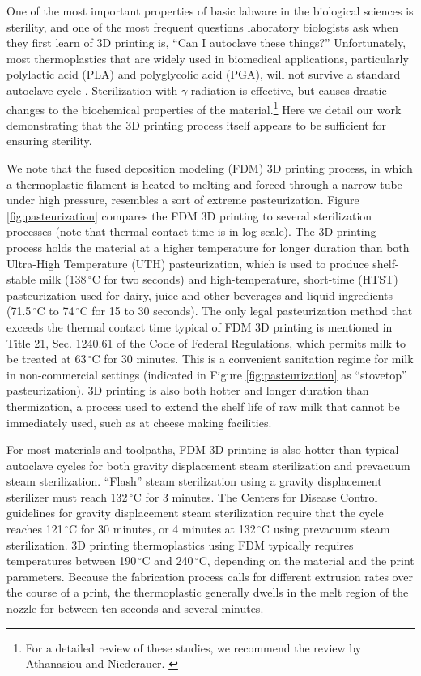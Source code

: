 \documentclass[fleqn,10pt]{wlpeerj}
\begin{document}
One of the most important properties of basic labware in the biological sciences is sterility, and one of the most frequent questions laboratory biologists ask when they first learn of 3D printing is, ``Can I autoclave these things?'' Unfortunately, most thermoplastics that are widely used in biomedical applications, particularly polylactic acid (PLA) and polyglycolic acid (PGA), will not survive a standard autoclave cycle \cite{steam_sterilization_PLA}. Sterilization with $\gamma$-radiation is effective, but causes drastic changes to the biochemical properties of the material.\footnote{For a detailed review of these studies, we recommend the review by Athanasiou and Niederauer. \cite{pla_suture_review}} \cite{gama_radiation_PLA} Here we detail our work demonstrating that the 3D printing process itself appears to be sufficient for ensuring sterility. 

We note that the fused deposition modeling (FDM) 3D printing process, in which a
thermoplastic filament is heated to melting and forced through a
narrow tube under high pressure, resembles a sort of extreme
pasteurization. Figure \ref{fig:pasteurization} compares the FDM 3D printing
to several sterilization processes (note that thermal contact time 
is in log scale). The 3D printing process holds the material at a higher
temperature for longer duration than both Ultra-High Temperature (UTH)
pasteurization, which is used to produce shelf-stable milk
(138$\,^{\circ}\mathrm{C}$ for two seconds) and high-temperature,
short-time (HTST) pasteurization used for dairy, juice and other
beverages and liquid ingredients (71.5$\,^{\circ}\mathrm{C}$ to
74$\,^{\circ}\mathrm{C}$ for 15 to 30 seconds). The only legal
pasteurization method that exceeds the thermal contact time typical of
FDM 3D printing is mentioned in Title 21, Sec. 1240.61 of the Code of
Federal Regulations, which permits milk to be treated at
63$\,^{\circ}\mathrm{C}$ for 30 minutes. This is a convenient sanitation
regime for milk in non-commercial settings (indicated in Figure
\ref{fig:pasteurization} as ``stovetop'' pasteurization). 3D printing is
also both hotter and longer duration than thermization, a process used
to extend the shelf life of raw milk that cannot be immediately used,
such as at cheese making facilities.

For most materials and toolpaths, FDM 3D printing is also hotter than
typical autoclave cycles for both gravity displacement steam
sterilization and prevacuum steam sterilization. ``Flash'' steam
sterilization using a gravity displacement sterilizer must reach
132$\,^{\circ}\mathrm{C}$ for 3 minutes. The Centers for Disease
Control guidelines for gravity displacement steam sterilization
require that the cycle reaches 121$\,^{\circ}\mathrm{C}$ for 30
minutes, or 4 minutes at 132$\,^{\circ}\mathrm{C}$ using prevacuum
steam sterilization. 3D printing thermoplastics using FDM typically
requires temperatures between 190$\,^{\circ}\mathrm{C}$ and
240$\,^{\circ}\mathrm{C}$, depending on the material and the print
parameters. Because the fabrication process calls for different 
extrusion rates over the course of a print, the thermoplastic 
generally dwells in the melt region of the nozzle for between 
ten seconds and several minutes. 
\end{document}
